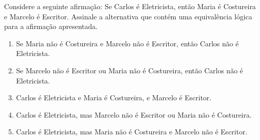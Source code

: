 \item
		 Considere a seguinte afirmação: Se Carlos é Eletricista, então Maria é Costureira e Marcelo é Escritor.
Assinale a alternativa que contém uma equivalência lógica para a afirmação apresentada.
\begin{enumerate}
		\item Se Maria não é Costureira e Marcelo não é Escritor, então Carlos não é Eletricista.
		\item Se Marcelo não é Escritor ou Maria não é Costureira, então Carlos não é Eletricista.
		\item Carlos é Eletricista e Maria é Costureira, e Marcelo é Escritor.
		\item Carlos é Eletricista, mas Marcelo não é Escritor ou Maria não é Costureira. 
		\item Carlos é Eletricista, mas Maria não é Costureira e Marcelo não é Escritor.
\end{enumerate}
